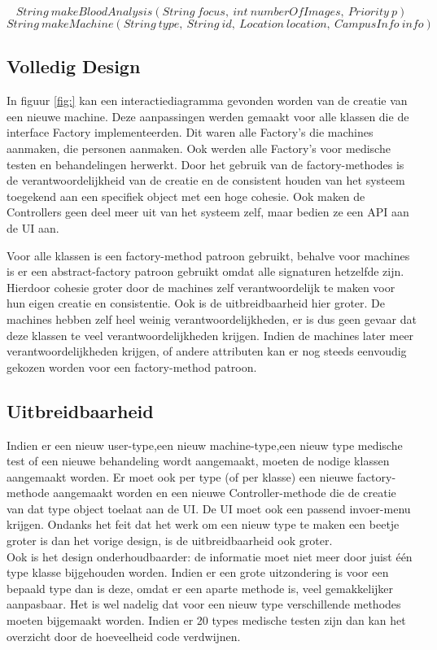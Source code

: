 \[ String\ makeBloodAnalysis(String\ focus,\ int\ numberOfImages,\ Priority\ p)\]
\[ String\ makeMachine(String\ type,\ String\ id,\ Location\ location,\ CampusInfo\ info)\]

\subsection{Volledig Design}
In figuur \ref{fig:} kan een interactiediagramma gevonden worden van de creatie van een nieuwe machine. 
Deze aanpassingen werden gemaakt voor alle klassen die de interface Factory implementeerden. 
Dit waren alle Factory's die machines aanmaken, die personen aanmaken. 
Ook werden alle Factory's voor medische testen en behandelingen herwerkt. 
Door het gebruik van de factory-methodes is de verantwoordelijkheid van de creatie en de consistent houden van het systeem toegekend aan een specifiek object met een hoge cohesie.
Ook maken de Controllers geen deel meer uit van het systeem zelf, maar bedien ze een API aan de UI aan. 

Voor alle klassen is een factory-method patroon gebruikt, behalve voor machines is er een abstract-factory patroon gebruikt omdat alle signaturen hetzelfde zijn. 
Hierdoor cohesie groter door de machines zelf verantwoordelijk te maken voor hun eigen creatie en consistentie. 
Ook is de uitbreidbaarheid hier groter.
De machines hebben zelf heel weinig verantwoordelijkheden, er is dus geen gevaar dat deze klassen te veel verantwoordelijkheden krijgen. 
Indien de machines later meer verantwoordelijkheden krijgen, of andere attributen kan er nog steeds eenvoudig gekozen worden voor een factory-method patroon.

\subsection{Uitbreidbaarheid}
Indien er een nieuw user-type,een nieuw machine-type,een nieuw type medische test of een nieuwe behandeling wordt aangemaakt, moeten de nodige klassen aangemaakt worden. 
Er moet ook per type (of per klasse) een nieuwe factory-methode aangemaakt worden en een nieuwe Controller-methode die de creatie van dat type object toelaat aan de UI.
De UI moet ook een passend invoer-menu krijgen. 
Ondanks het feit dat het werk om een nieuw type te maken een beetje groter is dan het vorige design, is de uitbreidbaarheid ook groter. \\

Ook is het design onderhoudbaarder: de informatie moet niet meer door juist één type klasse bijgehouden worden. 
Indien er een grote uitzondering is voor een bepaald type dan is deze, omdat er een aparte methode is, veel gemakkelijker aanpasbaar.
Het is wel nadelig dat voor een nieuw type verschillende methodes moeten bijgemaakt worden. 
Indien er 20 types medische testen zijn dan kan het overzicht door de hoeveelheid code verdwijnen.\\

